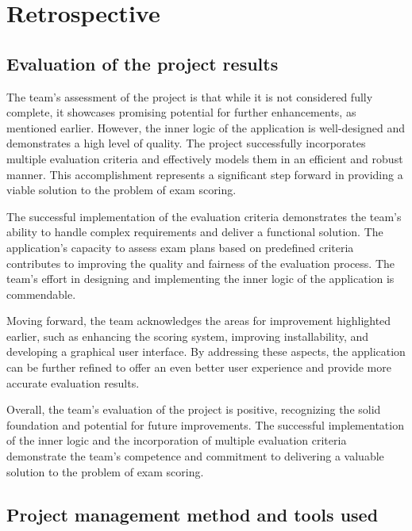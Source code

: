 \section{Retrospective}
\subsection{Evaluation of the project results}

The team's assessment of the project is that while it is not considered fully complete, it showcases promising potential for further enhancements, as mentioned earlier. However, the inner logic of the application is well-designed and demonstrates a high level of quality. The project successfully incorporates multiple evaluation criteria and effectively models them in an efficient and robust manner. This accomplishment represents a significant step forward in providing a viable solution to the problem of exam scoring.

\vspace{\baselineskip}

The successful implementation of the evaluation criteria demonstrates the team's ability to handle complex requirements and deliver a functional solution. The application's capacity to assess exam plans based on predefined criteria contributes to improving the quality and fairness of the evaluation process. The team's effort in designing and implementing the inner logic of the application is commendable.

\vspace{\baselineskip}


Moving forward, the team acknowledges the areas for improvement highlighted earlier, such as enhancing the scoring system, improving installability, and developing a graphical user interface. By addressing these aspects, the application can be further refined to offer an even better user experience and provide more accurate evaluation results.


\vspace{\baselineskip}


Overall, the team's evaluation of the project is positive, recognizing the solid foundation and potential for future improvements. The successful implementation of the inner logic and the incorporation of multiple evaluation criteria demonstrate the team's competence and commitment to delivering a valuable solution to the problem of exam scoring.

\subsection{Project management method and tools used}

